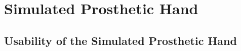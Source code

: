 \documentclass[../main.tex]{subfiles}
\begin{document}




\newpage
\section{Simulated Prosthetic Hand}
\label{sec:simtest}

\subsection{Usability of the Simulated Prosthetic Hand}
\end{document}
